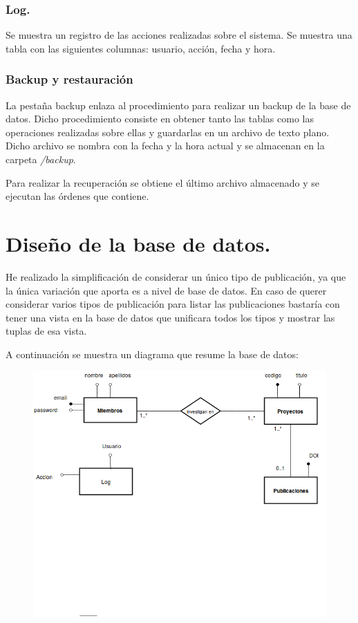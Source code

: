 \documentclass[a4paper, 11pt]{article} %
\begin{document}
\subsubsection{Log.} Se muestra un registro de las acciones realizadas sobre el sistema. Se muestra una tabla con las siguientes columnas: usuario, acción, fecha y hora.
\subsubsection{Backup y restauración} La pestaña backup enlaza al procedimiento para realizar un backup de la base de datos. Dicho procedimiento consiste en obtener tanto las tablas como las operaciones realizadas sobre ellas y guardarlas en un archivo de texto plano. Dicho archivo se nombra con la fecha y la hora actual y se almacenan en la carpeta \emph{/backup}. 
\medskip

Para realizar la recuperación se obtiene el último archivo almacenado y se ejecutan las órdenes que contiene.
 
\section{Diseño de la base de datos.}
He realizado la simplificación de considerar un único tipo de publicación, ya que la única variación que aporta es a nivel de base de datos. En caso de querer considerar varios tipos de publicación para listar las publicaciones bastaría con tener una vista en la base de datos que unificara todos los tipos y mostrar las tuplas de esa vista. 
\medskip

A continuación se muestra un diagrama que resume la base de datos:
\begin{figure}[H]
	\includegraphics[scale=0.65]{./diagrama_er.png}
\end{figure}
\end{document}
